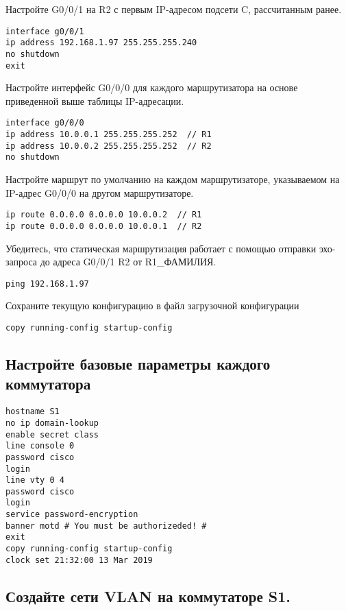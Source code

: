 Настройте G0/0/1 на R2 с первым IP-адресом подсети C, рассчитанным ранее.

\begin{verbatim}
interface g0/0/1
ip address 192.168.1.97 255.255.255.240
no shutdown
exit
\end{verbatim}

Настройте интерфейс G0/0/0 для каждого маршрутизатора
на основе приведенной выше таблицы IP-адресации.

\begin{verbatim}
interface g0/0/0
ip address 10.0.0.1 255.255.255.252  // R1
ip address 10.0.0.2 255.255.255.252  // R2
no shutdown
\end{verbatim}

Настройте маршрут по умолчанию на каждом маршрутизаторе,
указываемом на IP-адрес G0/0/0 на другом маршрутизаторе.

\begin{verbatim}
ip route 0.0.0.0 0.0.0.0 10.0.0.2  // R1
ip route 0.0.0.0 0.0.0.0 10.0.0.1  // R2
\end{verbatim}

Убедитесь, что статическая маршрутизация работает
с помощью отправки эхо-запроса до адреса G0/0/1 R2 от R1\_ФАМИЛИЯ.

\begin{verbatim}
ping 192.168.1.97
\end{verbatim}

Сохраните текущую конфигурацию в файл загрузочной конфигурации

\begin{verbatim}
copy running-config startup-config
\end{verbatim}

\subsection{Настройте базовые параметры каждого коммутатора}

\begin{verbatim}
hostname S1
no ip domain-lookup
enable secret class
line console 0
password cisco
login
line vty 0 4
password cisco
login
service password-encryption
banner motd # You must be authorizeded! #
exit
copy running-config startup-config
clock set 21:32:00 13 Mar 2019
\end{verbatim}

\subsection{Создайте сети VLAN на коммутаторе S1.}


